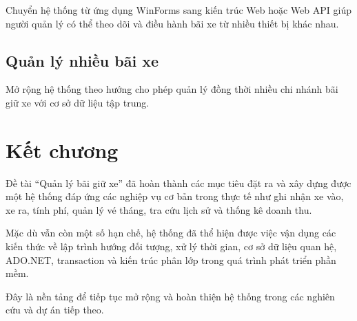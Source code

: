 Chuyển hệ thống từ ứng dụng WinForms sang kiến trúc Web hoặc
Web API giúp người quản lý có thể theo dõi và điều hành bãi xe
từ nhiều thiết bị khác nhau.

\subsection{Quản lý nhiều bãi xe}

Mở rộng hệ thống theo hướng cho phép quản lý đồng thời nhiều
chi nhánh bãi giữ xe với cơ sở dữ liệu tập trung.

\section*{Kết chương}

Đề tài ``Quản lý bãi giữ xe'' đã hoàn thành các mục tiêu đặt ra
và xây dựng được một hệ thống đáp ứng các nghiệp vụ cơ bản trong
thực tế như ghi nhận xe vào, xe ra, tính phí, quản lý vé tháng,
tra cứu lịch sử và thống kê doanh thu.

Mặc dù vẫn còn một số hạn chế, hệ thống đã thể hiện được việc
vận dụng các kiến thức về lập trình hướng đối tượng, xử lý thời
gian, cơ sở dữ liệu quan hệ, ADO.NET, transaction và kiến trúc
phân lớp trong quá trình phát triển phần mềm.

Đây là nền tảng để tiếp tục mở rộng và hoàn thiện hệ thống trong
các nghiên cứu và dự án tiếp theo.